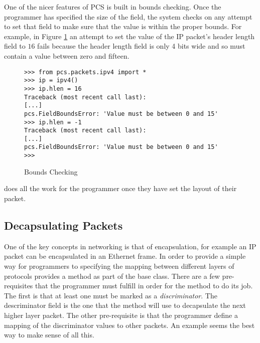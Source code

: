 \documentclass[11pt]{article}
\begin{document}
One of the nicer features of PCS is built in bounds checking.  Once
the programmer has specified the size of the field, the system checks
on any attempt to set that field to make sure that the value is within
the proper bounds.  For example, in Figure \ref{fig:bounds-checking-1}
an attempt to set the value of the IP packet's header length field to
$16$ fails because the header length field is only 4 bits wide and so
must contain a value between zero and fifteen.

\begin{figure}
  \centering
\begin{lstlisting}
>>> from pcs.packets.ipv4 import *
>>> ip = ipv4()
>>> ip.hlen = 16
Traceback (most recent call last):
[...]
pcs.FieldBoundsError: 'Value must be between 0 and 15'
>>> ip.hlen = -1
Traceback (most recent call last):
[...]
pcs.FieldBoundsError: 'Value must be between 0 and 15'
>>> 
\end{lstlisting}
  \caption{Bounds Checking}
  \label{fig:bounds-checking-1}
\end{figure}

 does all the work for the programmer once they have set
the layout of their packet.

\subsection{Decapsulating Packets}
\label{sec:decapsulating_packets}

One of the key concepts in networking is that of encapsulation, for
example an IP packet can be encapsulated in an Ethernet frame.  In
order to provide a simple way for programmers to specifying the
mapping between different layers of protocols  provides a
 method as part of the  base class. There
are a few pre-requisites that the programmer must fulfill in order for
the  method to do its job.  The first is that at least
one  must be marked as a \emph{discriminator}.  The
descriminator field is the one that the  method will use
to decapsulate the next higher layer packet.  The other pre-requisite
is that the programmer define a mapping of the discriminator values to
other packets.  An example seems the best way to make sense of all
this.
\end{document}
